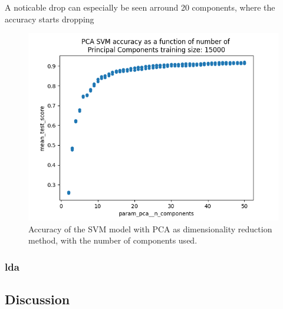 A noticable drop can especially be seen arround 20 components, where the accuracy starts dropping 

\begin{figure}[htb!]
    \centering
    \includegraphics[scale=0.5]{figures/experiment_two/pca_svm_15000.png}
    \caption{Accuracy of the SVM model with PCA as dimensionality reduction method, with the number of components used.}
    \label{fig:experiment_2_pca_svm}
\end{figure}

\subsubsection{\gls{lda}}\label{subsubsec:experiment_2_lda}

\subsection{Discussion}\label{subsec:experiment_2_discussion}



